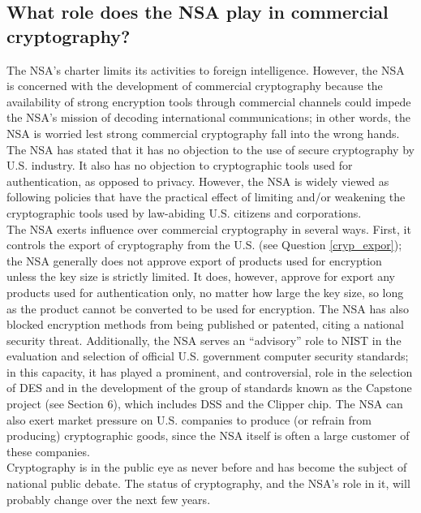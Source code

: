 \subsection{What role does the NSA play in commercial cryptography?}
\label{what_nsa_com}

The NSA's charter limits its activities to foreign intelligence.
However, the NSA is concerned with the development of commercial
cryptography because the availability of strong encryption tools
through commercial channels could impede the NSA's mission of decoding
international communications; in other words, the NSA is worried lest
strong commercial cryptography fall into the wrong hands.\\

The NSA has stated that it has no objection to the use of secure
cryptography by U.S. industry. It also has no objection to
cryptographic tools used for authentication, as opposed to privacy.
However, the NSA is widely viewed as following policies that have the
practical effect of limiting and/or weakening the cryptographic tools
used by law-abiding U.S. citizens and corporations.\\

The NSA exerts influence over commercial cryptography in several ways.
First, it controls the export of cryptography from the U.S. (see Question
\ref{cryp_expor}); the NSA generally does not approve export of products
used for encryption unless the key size is strictly limited. It does,
however, approve for export any products used for authentication only, no
matter how large the key size, so long as the product cannot be converted
to be used for encryption. The NSA has also blocked encryption methods from
being published or patented, citing a national security threat.
Additionally, the NSA serves an ``advisory'' role to NIST in the evaluation
and selection of official U.S. government computer security standards; in
this capacity, it has played a prominent, and controversial, role in the
selection of DES and in the development of the group of standards known as
the Capstone project (see Section 6), which includes DSS and the Clipper
chip. The NSA can also exert market pressure on U.S. companies to produce
(or refrain from producing) cryptographic goods, since the NSA itself is
often a large customer of these companies.\\

Cryptography is in the public eye as never before and has become the
subject of national public debate. The status of cryptography, and the
NSA's role in it, will probably change over the next few years.


